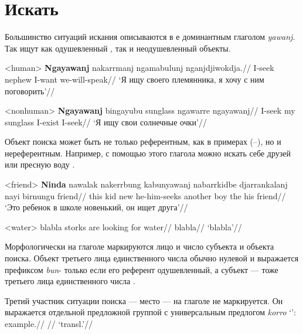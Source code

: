 
\section{Искать}
Большинство ситуаций искания описываются в  е доминантным глаголом \textit{yawanj}. Так ищут как одушевленный , так и неодушевленный  объекты. %

\ex<human> \begingl
\gla \textbf{Ngayawanj} nakarrmanj ngamabulunj nganjdjiwokdja.//
\glb I-seek nephew I-want we-will-speak//
\glft `Я ищу своего племянника, я хочу с ним поговорить'//
\endgl \xe

\ex<nonhuman> \begingl
\gla \textbf{Ngayawanj} bingayubu sunglass ngawarre ngayawanj//
\glb I-seek my sunglass I-exist I-seek//
\glft `Я ищу свои солнечные очки'//
\endgl \xe

Объект поиска может быть не только референтным, как в примерах (--), но и нереферентным. Например, с помощью этого глагола можно искать себе друзей  или пресную воду .

\ex<friend> \begingl
\gla \textbf{Ninda} nawalak nakerrbung kabunyawanj nabarrkidbe djarrankalanj nayi birnungu friend//
\glb this kid new he-him-seeks another boy the his friend//
\glft `Это ребенок в школе новенький, он ищет друга'//
\endgl \xe

\ex<water>\begingl
\gla blabla storks are looking for water//
\glb blabla//
\glft `blabla'//
\endgl \xe

Морфологически на глаголе маркируются лицо и число субъекта и объекта поиска. Объект третьего лица единственного числа обычно нулевой и выражается префиксом \textit{bun}- только если его референт одушевленный, а субъект --- тоже третьего лица единственного числа . 


Третий участник ситуации поиска --- место --- на глаголе не маркируется. Он выражается отдельной предложной группой с универсальным предлогом \textit{korro} `\korro':
\begingl
\gla example.//
\glb //
\glft `transl.'\trailingcitation{[src]}//
\endgl\xe

